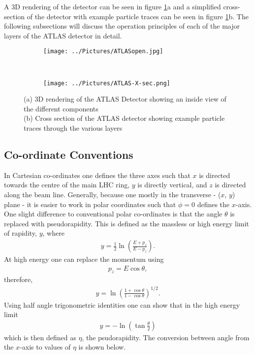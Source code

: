 A 3D rendering of the detector can be seen in figure \ref{fig:ATLAS}a and a simplified cross-section of the detector with example particle traces can be seen in figure \ref{fig:ATLAS}b.
The following subsections will discuss the operation principles of each of the major layers of the ATLAS detector in detail.

\begin{figure}[H]
    \centering
    \begin{subfigure}[b]{0.48\textwidth}
        \centering
        \texttt{[image: ../Pictures/ATLASopen.jpg]}
    \caption{}
    \end{subfigure}
    ~
    \begin{subfigure}[b]{0.48\textwidth}
        \centering
        \texttt{[image: ../Pictures/ATLAS-X-sec.png]}
    \caption{}    
        \end{subfigure}
\caption{(a) 3D rendering of the ATLAS Detector showing an inside view of the different components \\ (b) Cross section of the ATLAS detector showing example particle traces through the various layers}
\label{fig:ATLAS}
\end{figure}

\subsection{Co-ordinate Conventions}
In Cartesian co-ordinates one defines the three axes such that $x$ is directed towards the centre of the main LHC ring, $y$ is directly vertical, and $z$ is directed along the beam line.
Generally, because one mostly in the transverse - ($x$, $y$) plane - it is easier to work in polar coordinates such that $\phi=0$ defines the $x$-axis.
One slight difference to conventional polar co-ordinates is that the angle $\theta$ is replaced with pseudorapidity. 
This is defined as the massless or high energy limit of rapidity, $y$, where
\begin{align}
y = \frac{1}{2} \ln \left( \frac{E + p_{z}}{E - p_{z}} \right).
\end{align}
At high energy one can replace the momentum using
\begin{align}
p_{z} = E \cos \theta, 
\end{align}
therefore,
\begin{align}
y = \ln \left( \frac{1 + \cos \theta}{1 - \cos \theta} \right)^{1/2}.
\end{align}
Using half angle trigonometric identities one can show that in the high energy limit
\begin{align}
y = - \ln \left( \tan \frac{\theta}{2} \right)
\end{align}
which is then defined as $\eta$, the psudorapidity.
The conversion between angle from the $x$-axis to values of $\eta$ is shown below.

